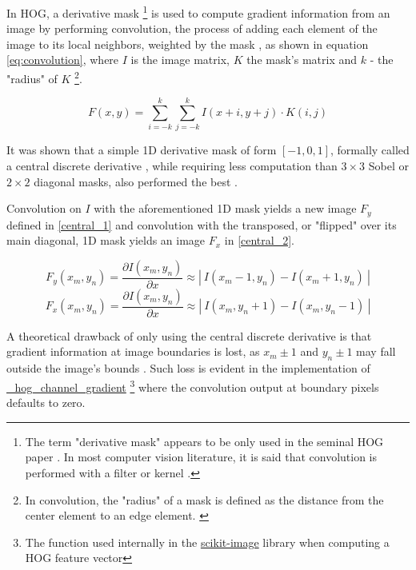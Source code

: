 In HOG, a derivative mask \footnote{The term "derivative mask" appears to be only used in the seminal HOG paper \cite{dalal_2005_histograms}. In most computer vision literature, it is said that convolution is performed with a filter or kernel \cite{niebles2012edge}.}  is used to compute gradient information from an image \cite{dalal_2005_histograms} by performing convolution, the process of adding each element of the image to its local neighbors, weighted by the mask \cite{niebles2012edge}, as shown in equation \ref{eq:convolution}, where $I$ is the image matrix, $K$ the mask's matrix and $k$ - the "radius" of $K$ \footnote{In convolution, the "radius" of a mask is defined as the distance from the center element to an edge element. \cite{niebles2012edge}}.

\begin{equation}\label{eq:convolution}
    F(x,y) = \sum_{i=-k}^{k} \sum_{j=-k}^{k} I(x+i,y+j) \cdot K(i,j)
\end{equation}

It was shown that a simple 1D derivative mask of form $[-1,0,1]$, formally called a central discrete derivative \cite{niebles2012edge}, while requiring less computation than $3\times3$ Sobel or $2\times2$ diagonal masks, also performed the best \cite{dalal_2005_histograms}.

Convolution on $I$ with the aforementioned 1D mask yields a new image $F_y$ defined in \ref{central_1} and convolution with the transposed, or "flipped" over its main diagonal, 1D mask yields an image $F_x$ in \ref{central_2}.

\begin{equation}\label{central_1}
    F_{y}(x_{m},y_{n}) = \frac{ \partial I(x_{m},y_{n}) }{ \partial x } \approx |\ I(x_{m}-1,y_{n})-I(x_{m}+1,y_{n})\ | 
\end{equation}
\begin{equation}\label{central_2}
    F_{x}(x_{m},y_{n}) = \frac{ \partial I(x_{m},y_{n}) }{ \partial x } \approx |\ I(x_{m},y_{n}+1)-I(x_{m},y_{n}-1)\ | 
\end{equation}

A theoretical drawback of only using the central discrete derivative is that gradient information at image boundaries is lost, as $x_m\pm 1$ and $y_n\pm 1$ may fall outside the image's bounds \cite{shidlovskiy_2020_reducing}. Such loss is evident in the implementation of \href{https://github.com/scikit-image/scikit-image/blob/main/skimage/feature/_hog.py}{\_hog\_channel\_gradient} \footnote{The function used internally in the \href{https://scikit-image.org/}{scikit-image} library when computing a HOG feature vector } where the convolution output at boundary pixels defaults to zero. 

